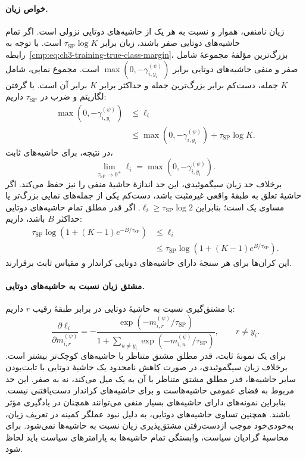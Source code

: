 \paragraph{خواص زیان.}
زیان نامنفی، هموار و نسبت به هر یک از حاشیه‌های
دوتایی نزولی است. اگر تمام حاشیه‌های دوتایی صفر
باشند، زیان برابر $\tau_{\mathrm{SP}}\log K$ است.
با توجه به
رابطه~\eqref{cmp:eq:ch3-training-true-class-margin}،
بزرگ‌ترین مؤلفهٔ مجموعهٔ شامل صفر و منفی
حاشیه‌های دوتایی برابر
$\max(0,-\gamma_{i,y_i}^{(\psi)})$ است.
مجموع نمایی، شامل $K$ جمله، دست‌کم برابر
بزرگ‌ترین جمله و حداکثر برابر $K$ برابر آن است.
با گرفتن لگاریتم و ضرب در $\tau_{\mathrm{SP}}$
داریم:
\begin{equation}\label{cmp:eq:ch3-training-softplus-bounds}
\boxed{
\begin{aligned}
\max(0,-\gamma_{i,y_i}^{(\psi)})
&\le\ell_i\\
&\le\max(0,-\gamma_{i,y_i}^{(\psi)})
+\tau_{\mathrm{SP}}\log K.
\end{aligned}}
\end{equation}
در نتیجه، برای حاشیه‌های ثابت،
\[
\lim_{\tau_{\mathrm{SP}}\to0^+}\ell_i
=\max(0,-\gamma_{i,y_i}^{(\psi)}).
\]
برخلاف حد زیان سیگموئیدی، این حد اندازهٔ حاشیهٔ
منفی را نیز حفظ می‌کند.
اگر حاشیهٔ تعلق به طبقهٔ واقعی غیرمثبت باشد،
دست‌کم یکی از جمله‌های نمایی بزرگ‌تر یا مساوی
یک است؛ بنابراین
$\ell_i\ge\tau_{\mathrm{SP}}\log2$.
اگر قدر مطلق تمام حاشیه‌های دوتایی حداکثر $B$
باشد، داریم:
\begin{equation}\label{cmp:eq:ch3-training-softplus-range}
\begin{aligned}
\tau_{\mathrm{SP}}\log\left(1+(K-1)e^{-B/\tau_{\mathrm{SP}}}\right)
&\le\ell_i\\
&\le\tau_{\mathrm{SP}}\log\left(1+(K-1)e^{B/\tau_{\mathrm{SP}}}\right).
\end{aligned}
\end{equation}
این کران‌ها برای هر سنجهٔ دارای حاشیه‌های دوتایی
کراندار و مقیاس ثابت برقرارند.

\paragraph{مشتق زیان نسبت به حاشیه‌های دوتایی.}
با مشتق‌گیری نسبت به حاشیهٔ دوتایی در برابر
طبقهٔ رقیب $r$ داریم:
\begin{equation}\label{cmp:eq:ch3-training-softplus-derivative}
\boxed{
\frac{\partial\ell_i}{\partial m_{i,r}^{(\psi)}}
=-\frac{\exp(-m_{i,r}^{(\psi)}/\tau_{\mathrm{SP}})}
{1+\displaystyle\sum_{u\ne y_i}
\exp(-m_{i,u}^{(\psi)}/\tau_{\mathrm{SP}})},
\qquad r\ne y_i.
}
\end{equation}
برای یک نمونهٔ ثابت، قدر مطلق مشتق متناظر با
حاشیه‌های کوچک‌تر بیشتر است. برخلاف زیان
سیگموئیدی، در صورت کاهش نامحدود یک حاشیهٔ
دوتایی با ثابت‌بودن سایر حاشیه‌ها، قدر مطلق
مشتق متناظر با آن به یک میل می‌کند، نه به صفر.
این حد مربوط به فضای عمومی حاشیه‌هاست و برای
حاشیه‌های کراندار دست‌یافتنی نیست.
بنابراین نمونه‌های دارای حاشیه‌های بسیار منفی
می‌توانند همچنان در یادگیری مؤثر باشند.
همچنین تساوی حاشیه‌های دوتایی، به دلیل نبود
عملگر کمینه در تعریف زیان، به‌خودی‌خود موجب
ازدست‌رفتن مشتق‌پذیری زیان نسبت به حاشیه‌ها
نمی‌شود. برای محاسبهٔ گرادیان سیاست، وابستگی
تمام حاشیه‌ها به پارامترهای سیاست باید لحاظ شود.

